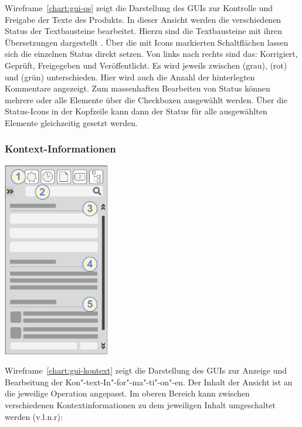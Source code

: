 Wireframe~\ref{chart:gui-qs} zeigt die Darstellung des GUIs zur Kontrolle und Freigabe der Texte des Produkts. In dieser Ansicht werden die verschiedenen Status der Textbausteine bearbeitet. Hierzu sind die Textbausteine mit ihren Übersetzungen dargestellt . Über die mit Icons markierten Schaltflächen  lassen sich die einzelnen Status direkt setzen. Von links nach rechts sind das: Korrigiert, Geprüft, Freigegeben und Veröffentlicht. Es wird jeweils zwischen  (grau),  (rot) und  (grün) unterschieden. Hier wird auch die Anzahl der hinterlegten Kommentare angezeigt. Zum massenhaften Bearbeiten von Status können mehrere oder alle Elemente über die Checkboxen  ausgewählt werden. Über die Status-Icons in der Kopfzeile kann dann der Status für alle ausgewählten Elemente gleichzeitig gesetzt werden.

\pagebreak

\subsubsection{Kontext-Informationen}\label{l:gui-kontext}

\begin{center}
\includegraphics[width=0.35\textwidth]{media/GUIKontext-Informationen.pdf}
\label{chart:gui-kontext}
\end{center}

Wireframe~\ref{chart:gui-kontext} zeigt die Darstellung des GUIs zur Anzeige und Bearbeitung der Kon"-text-In"-for"-ma"-ti"-on"-en. Der Inhalt der Ansicht ist an die jeweilige Operation angepasst. Im oberen Bereich kann zwischen verschiedenen Kontextinformationen zu dem jeweiligen Inhalt umgeschaltet werden  (v.l.n.r): 

